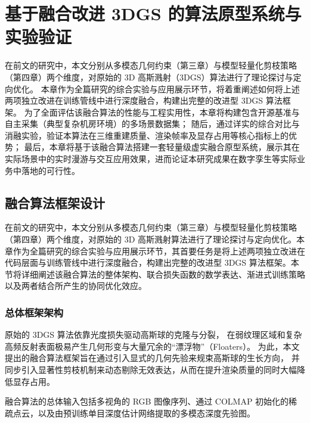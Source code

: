 \chapter{基于融合改进 3DGS 的算法原型系统与实验验证}

在前文的研究中，本文分别从多模态几何约束（第三章）与模型轻量化剪枝策略（第四章）两个维度，对原始的 3D 高斯溅射（3DGS）算法进行了理论探讨与定向优化。
本章作为全篇研究的综合实验与应用展示环节，将着重阐述如何将上述两项独立改进在训练管线中进行深度融合，构建出完整的改进型 3DGS 算法框架。
为了全面评估该融合算法的性能与工程实用性，本章将构建包含开源基准与自主采集（典型复杂机房环境）的多场景数据集；
随后，通过详实的综合对比与消融实验，验证本算法在三维重建质量、渲染帧率及显存占用等核心指标上的优势；
最后，本章将基于该融合算法搭建一套轻量级虚实融合原型系统，展示其在实际场景中的实时漫游与交互应用效果，进而论证本研究成果在数字孪生等实际业务中落地的可行性。

\section{融合算法框架设计}
\label{sec:fusion_framework}

在前文的研究中，本文分别从多模态几何约束（第三章）与模型轻量化剪枝策略（第四章）两个维度，对原始的 3D 高斯溅射算法进行了理论探讨与定向优化。本章作为全篇研究的综合实验与应用展示环节，其首要任务是将上述两项独立改进在代码层面与训练管线中进行深度融合，构建出完整的改进型 3DGS 算法框架。本节将详细阐述该融合算法的整体架构、联合损失函数的数学表达、渐进式训练策略以及两者结合所产生的协同优化效应。

\subsection{总体框架架构}
\label{subsec:overall_architecture}

原始的 3DGS 算法依靠光度损失驱动高斯球的克隆与分裂，
在弱纹理区域和复杂高频反射表面极易产生几何形变与大量冗余的“漂浮物”（Floaters）\cite{kerbl20233d}。
为此，本文提出的融合算法框架旨在通过引入显式的几何先验来规束高斯球的生长方向，
并同步引入显著性剪枝机制来动态剔除无效表达，从而在提升渲染质量的同时大幅降低显存占用。

融合算法的总体输入包括多视角的 RGB 图像序列、通过 COLMAP \cite{schonberger2016structure} 初始化的稀疏点云，以及由预训练单目深度估计网络提取的多模态深度先验图。



